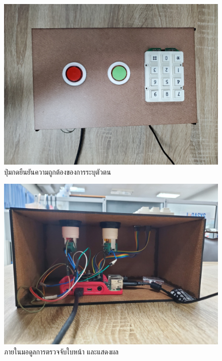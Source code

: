 
\begin{figure}[!ht]
  \begin{center}
    \includegraphics[scale=.17]{pic/rpi_top.jpg}
    \caption[ปุ่มกดยืนยันความถูกต้องของการระบุตัวตน]{ปุ่มกดยืนยันความถูกต้องของการระบุตัวตน}
    \label{fig:button_module}
  \end{center}
\end{figure}

\begin{figure}[!ht]
  \begin{center}
    \includegraphics[scale=.17]{pic/rpi_back.jpg}
    \caption[ภายในมอดูลการตรวจจับใบหน้า และแสดงผล]{ภายในมอดูลการตรวจจับใบหน้า และแสดงผล}
    \label{fig:inside_module}
  \end{center}
\end{figure}

